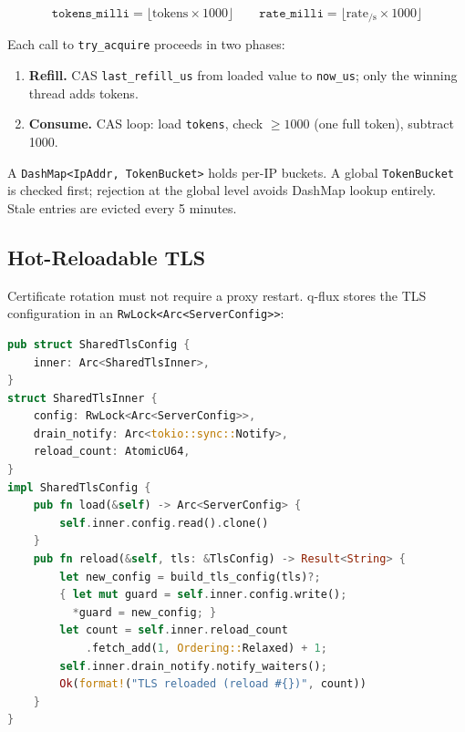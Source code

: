 \documentclass[a4paper, 11pt]{article}
\begin{document}
\begin{equation}
\texttt{tokens\_milli} = \lfloor \text{tokens} \times 1000 \rfloor
\qquad
\texttt{rate\_milli} = \lfloor \text{rate}_{\text{/s}} \times 1000 \rfloor
\end{equation}

Each call to \texttt{try\_acquire} proceeds in two phases:

\begin{enumerate}
\item \textbf{Refill.} CAS \texttt{last\_refill\_us} from loaded value
  to \texttt{now\_us}; only the winning thread adds tokens.
\item \textbf{Consume.} CAS loop: load \texttt{tokens}, check
  $\geq 1000$ (one full token), subtract 1000.
\end{enumerate}

A \texttt{DashMap<IpAddr, TokenBucket>} holds per-IP buckets. A global
\texttt{TokenBucket} is checked first; rejection at the global level
avoids DashMap lookup entirely. Stale entries are evicted every 5 minutes.

\subsection{Hot-Reloadable TLS}
\label{sec:tls-reload}

Certificate rotation must not require a proxy restart. q-flux stores
the TLS configuration in an \texttt{RwLock<Arc<ServerConfig>>}:

\begin{lstlisting}[language=Rust,
  caption={\texttt{SharedTlsConfig} from \texttt{acceptor.rs}.
  The write lock is held only for the pointer swap.},
  label={lst:tls-reload}]
pub struct SharedTlsConfig {
    inner: Arc<SharedTlsInner>,
}
struct SharedTlsInner {
    config: RwLock<Arc<ServerConfig>>,
    drain_notify: Arc<tokio::sync::Notify>,
    reload_count: AtomicU64,
}
impl SharedTlsConfig {
    pub fn load(&self) -> Arc<ServerConfig> {
        self.inner.config.read().clone()
    }
    pub fn reload(&self, tls: &TlsConfig) -> Result<String> {
        let new_config = build_tls_config(tls)?;
        { let mut guard = self.inner.config.write();
          *guard = new_config; }
        let count = self.inner.reload_count
            .fetch_add(1, Ordering::Relaxed) + 1;
        self.inner.drain_notify.notify_waiters();
        Ok(format!("TLS reloaded (reload #{})", count))
    }
}
\end{lstlisting}
\end{document}
